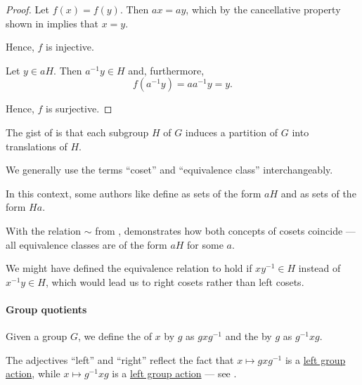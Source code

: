 \begin{proof}
   Let \( f(x) = f(y) \). Then \( a x = a y \), which by the cancellative property shown in  implies that \( x = y \).

  Hence, \( f \) is injective.

   Let \( y \in a H \). Then \( a^{-1} y \in H \) and, furthermore,
  \begin{equation*}
    f(a^{-1} y) = a a^{-1} y = y.
  \end{equation*}

  Hence, \( f \) is surjective.
\end{proof}

\begin{remark}\label{rem:subgroup_cosets}
  The gist of  is that each subgroup \( H \) of \( G \) induces a partition of \( G \) into translations of \( H \).

  We generally use the terms \enquote{coset} and \enquote{equivalence class} interchangeably.

  In this context, some authors like  define  as sets of the form \( a H \) and  as sets of the form \( H a \).

  With the relation \( {\sim} \) from ,  demonstrates how both concepts of cosets coincide --- all equivalence classes are of the form \( a H \) for some \( a \).

  We might have defined the equivalence relation to hold if \( x y^{-1} \in H \) instead of \( x^{-1} y \in H \), which would lead us to right cosets rather than left cosets.
\end{remark}

\paragraph{Group quotients}

\begin{definition}\label{def:group_conjugation}
  Given a group \( G \), we define the  of \( x \) by \( g \) as \( g x g^{-1} \) and the  by \( g \) as \( g^{-1} x g \).
\end{definition}
\begin{comments}
  \item The adjectives \enquote{left} and \enquote{right} reflect the fact that \( x \mapsto g x g^{-1} \) is a \hyperref[def:group_action]{left group action}, while \( x \mapsto g^{-1} x g \) is a \hyperref[def:group_action]{left group action} --- see .
\end{comments}

